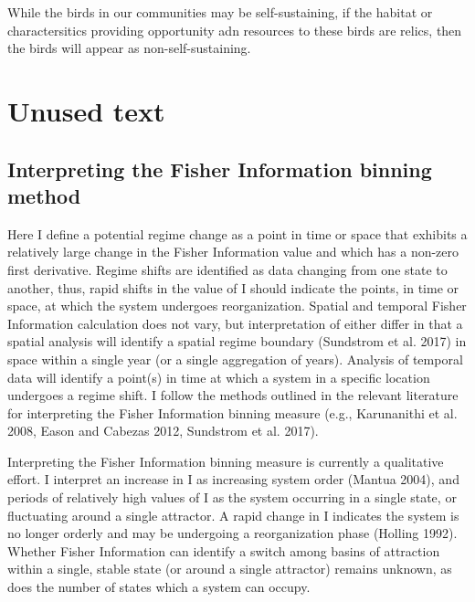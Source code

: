\documentclass[12pt,twoside,openany]{reedthesis}
\begin{document}
While the birds in our communities may be self-sustaining, if the
habitat or charactersitics providing opportunity adn resources to these
birds are relics, then the birds will appear as non-self-sustaining.

\section{Unused text}\label{unused-text}

\subsection{Interpreting the Fisher Information binning
method}\label{interpreting-the-fisher-information-binning-method}

Here I define a potential regime change as a point in time or space that
exhibits a relatively large change in the Fisher Information value and
which has a non-zero first derivative. Regime shifts are identified as
data changing from one state to another, thus, rapid shifts in the value
of I should indicate the points, in time or space, at which the system
undergoes reorganization. Spatial and temporal Fisher Information
calculation does not vary, but interpretation of either differ in that a
spatial analysis will identify a spatial regime boundary (Sundstrom et
al. 2017) in space within a single year (or a single aggregation of
years). Analysis of temporal data will identify a point(s) in time at
which a system in a specific location undergoes a regime shift. I follow
the methods outlined in the relevant literature for interpreting the
Fisher Information binning measure (e.g., Karunanithi et al. 2008, Eason
and Cabezas 2012, Sundstrom et al. 2017).

Interpreting the Fisher Information binning measure is currently a
qualitative effort. I interpret an increase in I as increasing system
order (Mantua 2004), and periods of relatively high values of I as the
system occurring in a single state, or fluctuating around a single
attractor. A rapid change in I indicates the system is no longer orderly
and may be undergoing a reorganization phase (Holling 1992). Whether
Fisher Information can identify a switch among basins of attraction
within a single, stable state (or around a single attractor) remains
unknown, as does the number of states which a system can occupy.
\end{document}
